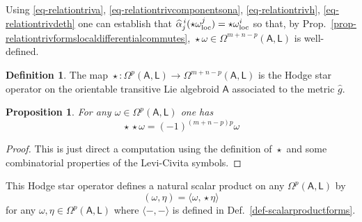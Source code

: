 \documentclass[number]{elsarticle}
\newtheorem{proposition}[theorem]{Proposition}
\theoremstyle{definition}
\newtheorem{definition}[theorem]{Definition}
\theoremstyle{remark}
\numberwithin{equation}{section}
\begin{document}
Using \eqref{eq-relationtriva}, \eqref{eq-relationtrivcomponentsona}, \eqref{eq-relationtrivh}, \eqref{eq-relationtrivdeth} one can establish that ${\widehat{\alpha}}_{j}^{\,i}({\mathop{\star}} \omega_{{\text{\textup{loc}}}}^j) = {\mathop{\star}} \omega_{{\text{\textup{loc}}}}^i$ so that, by Prop.~\ref{prop-relationtrivformslocaldifferentialcommutes}, ${\mathop{\star}} \omega \in \Omega^{m+n-p}({{{{\mathbf{\mathsf{{A}}}}}}}, {{{{\mathbf{\mathsf{{L}}}}}}})$ is well-defined. 

\begin{definition}
The map ${\mathop{\star}} : \Omega^p({{{{\mathbf{\mathsf{{A}}}}}}}, {{{{\mathbf{\mathsf{{L}}}}}}}) \rightarrow \Omega^{m+n-p}({{{{\mathbf{\mathsf{{A}}}}}}}, {{{{\mathbf{\mathsf{{L}}}}}}})$ is the Hodge star operator on the orientable transitive Lie algebroid ${{{{\mathbf{\mathsf{{A}}}}}}}$ associated to the metric ${{\widehat{g}}}$.
\end{definition}

\begin{proposition}
For any $\omega \in \Omega^p({{{{\mathbf{\mathsf{{A}}}}}}}, {{{{\mathbf{\mathsf{{L}}}}}}})$ one has
\begin{equation*}
{\mathop{\star}} {\mathop{\star}} \omega = (-1)^{(m+n-p)p} \omega
\end{equation*}
\end{proposition}

\begin{proof}
This is just direct a computation using the definition of ${\mathop{\star}}$ and some combinatorial properties of the Levi-Civita symbols.
\end{proof}

This Hodge star operator defines a natural scalar product on any $\Omega^p({{{{\mathbf{\mathsf{{A}}}}}}}, {{{{\mathbf{\mathsf{{L}}}}}}})$ by
\begin{equation*}
( \omega, \eta ) = \langle \omega, {\mathop{\star}} \eta  \rangle
\end{equation*}
for any $\omega, \eta  \in \Omega^p({{{{\mathbf{\mathsf{{A}}}}}}}, {{{{\mathbf{\mathsf{{L}}}}}}})$ where $\langle -, - \rangle$ is defined in Def.~\ref{def-scalarproductforms}.
\end{document}
